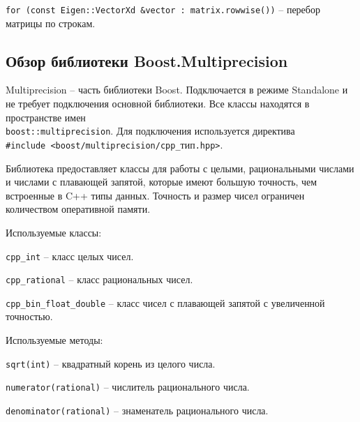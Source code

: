 \verb!for (const Eigen::VectorXd &vector : matrix.rowwise())! -- перебор матрицы по строкам.

\subsection{Обзор библиотеки Boost.Multiprecision}

Multiprecision -- часть библиотеки Boost. Подключается в режиме Standalone и не требует подключения основной библиотеки. Все классы находятся в пространстве имен \\ \verb!boost::multiprecision!. Для подключения используется директива \\ \verb!#include <boost/multiprecision/cpp_!тип\verb!.hpp>!.

Библиотека предоставляет классы для работы с целыми, рациональными числами и числами с плавающей запятой, которые имеют большую точность, чем встроенные в C++ типы данных. Точность и размер чисел ограничен количеством оперативной памяти. 

Используемые классы:

\verb!cpp_int! -- класс целых чисел.

\verb!cpp_rational! -- класс рациональных чисел.

\verb!cpp_bin_float_double! -- класс чисел с плавающей запятой с увеличенной точностью.

Используемые методы:

\verb!sqrt(int)! -- квадратный корень из целого числа.

\verb!numerator(rational)! -- числитель рационального числа.

\verb!denominator(rational)! -- знаменатель рационального числа.

\clearpage